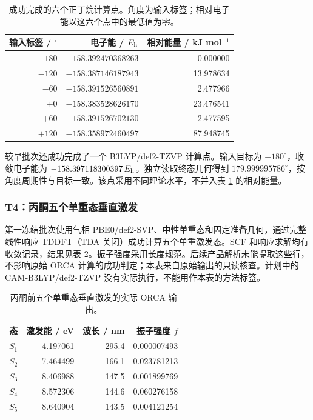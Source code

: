 \begin{table}[htbp]
\centering\small
\caption{成功完成的六个正丁烷计算点。角度为输入标签；相对电子能以这六个点中的最低值为零。}
\label{tab:t3-energies}
\begin{tabular}{rrr}
\toprule
输入标签 / $^\circ$ & 电子能 / $E_{\mathrm h}$ & 相对能量 / kJ mol$^{-1}$\\
\midrule
$-180$ & $-158.392470368263$ & 0.000000\\
$-120$ & $-158.387146187943$ & 13.978634\\
$-60$ & $-158.391526560891$ & 2.477966\\
$+0$ & $-158.383528626170$ & 23.476541\\
$+60$ & $-158.391526702130$ & 2.477595\\
$+120$ & $-158.358972460497$ & 87.948745\\
\bottomrule
\end{tabular}
\end{table}

较早批次还成功完成了一个 B3LYP/def2-TZVP 计算点。输入目标为 $-180^\circ$，收敛电子能为 $-158.397118300397\,E_{\mathrm h}$。独立读取终态几何得到 $179.999995786^\circ$，按角度周期性与目标一致。该点采用不同理论水平，不并入表 \ref{tab:t3-energies} 的相对能量。

\subsubsection{T4：丙酮五个单重态垂直激发}
第一冻结批次使用气相 PBE0/def2-SVP、中性单重态和固定准备几何，通过完整线性响应 TDDFT（TDA 关闭）成功计算五个单重激发态。SCF 和响应求解均有收敛记录，结果见表 \ref{tab:t4-excitations}。振子强度采用长度规范。后续产品解析未能提取这些行，不影响原始 ORCA 计算的成功判定；本表来自原始输出的只读核查。计划中的 CAM-B3LYP/def2-TZVP 没有实际执行，不能用作本表的方法标签。

\begin{table}[htbp]
\centering\small
\caption{丙酮前五个单重态垂直激发的实际 ORCA 输出。}
\label{tab:t4-excitations}
\begin{tabular}{rrrr}
\toprule
态 & 激发能 / eV & 波长 / nm & 振子强度 $f$\\
\midrule
$S_{1}$ & 4.197061 & 295.4 & 0.000007493\\
$S_{2}$ & 7.464499 & 166.1 & 0.023781213\\
$S_{3}$ & 8.406988 & 147.5 & 0.001899769\\
$S_{4}$ & 8.572306 & 144.6 & 0.060276158\\
$S_{5}$ & 8.640904 & 143.5 & 0.004121254\\
\bottomrule
\end{tabular}
\end{table}

